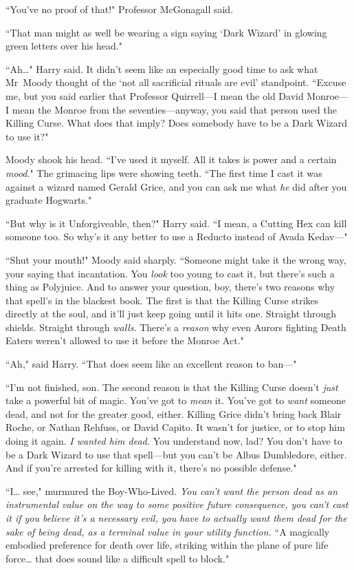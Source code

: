 ``You've no proof of that!" Professor McGonagall said.

``That man might as well be wearing a sign saying `Dark Wizard' in glowing green letters over his head."

``Ah{\ldots}" Harry said. It didn't seem like an especially good time to ask what Mr~Moody thought of the `not all sacrificial rituals are evil' standpoint. ``Excuse me, but you said earlier that Professor Quirrell—I mean the old David Monroe—I mean the Monroe from the seventies—anyway, you said that person used the Killing Curse. What does that imply? Does somebody have to be a Dark Wizard to use it?"

Moody shook his head. ``I've used it myself. All it takes is power and a certain \emph{mood}." The grimacing lips were showing teeth. ``The first time I cast it was against a wizard named Gerald Grice, and you can ask me what \emph{he} did after you graduate Hogwarts."

``But why is it Unforgiveable, then?" Harry said. ``I mean, a Cutting Hex can kill someone too. So why's it any better to use a Reducto instead of Avada Kedav—"

``Shut your mouth!" Moody said sharply. ``Someone might take it the wrong way, your saying that incantation. You \emph{look} too young to cast it, but there's such a thing as Polyjuice. And to answer your question, boy, there's two reasons why that spell's in the blackest book. The first is that the Killing Curse strikes directly at the soul, and it'll just keep going until it hits one. Straight through shields. Straight through \emph{walls}. There's a \emph{reason} why even Aurors fighting Death Eaters weren't allowed to use it before the Monroe Act."

``Ah," said Harry. ``That does seem like an excellent reason to ban—"

``I'm not finished, son. The second reason is that the Killing Curse doesn't \emph{just} take a powerful bit of magic. You've got to \emph{mean} it. You've got to \emph{want} someone dead, and not for the greater good, either. Killing Grice didn't bring back Blair Roche, or Nathan Rehfuss, or David Capito. It wasn't for justice, or to stop him doing it again. \emph{I wanted him dead.} You understand now, lad? You don't have to be a Dark Wizard to use that spell—but you can't be Albus Dumbledore, either. And if you're arrested for killing with it, there's no possible defense."

``I{\ldots} see," murmured the Boy-Who-Lived. \emph{You can't want the person dead as an instrumental value on the way to some positive future consequence, you can't cast it if you believe it's a necessary evil, you have to actually want them dead for the sake of being dead, as a terminal value in your utility function.} ``A magically embodied preference for death over life, striking within the plane of pure life force{\ldots} that does sound like a difficult spell to block."

